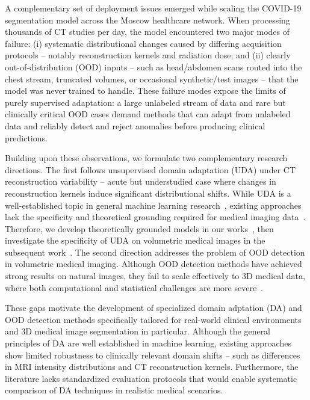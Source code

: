 A complementary set of deployment issues emerged while scaling the COVID-19 segmentation model across the Moscow healthcare network. When processing thousands of CT studies per day, the model encountered two major modes of failure: (i) systematic distributional changes caused by differing acquisition protocols -- notably reconstruction kernels and radiation dose; and (ii) clearly out-of-distribution (OOD) inputs -- such as head/abdomen scans routed into the chest stream, truncated volumes, or occasional synthetic/test images -- that the model was never trained to handle. These failure modes expose the limits of purely supervised adaptation: a large unlabeled stream of data and rare but clinically critical OOD cases demand methods that can adapt from unlabeled data and reliably detect and reject anomalies before producing clinical predictions.

Building upon these observations, we formulate two complementary research directions. The first follows unsupervised domain adaptation (UDA) under CT reconstruction variability -- acute but understudied case where changes in reconstruction kernels induce significant distributional shifts. While UDA is a well-established topic in general machine learning research~\cite{dann}, existing approaches lack the specificity and theoretical grounding required for medical imaging data~\cite{gulrajani2020search,uda_survey_2020,zhuang2020comprehensive,peng2018visda,zhang2021empirical}. Therefore, we develop theoretically grounded models in our works~\cite{saparov2021zero,shimovolos2022adaptation}, then investigate the specificity of UDA on volumetric medical images in the subsequent work~\cite{shirokikh2025m3da}. The second direction addresses the problem of OOD detection in volumetric medical imaging. Although OOD detection methods have achieved strong results on natural images, they fail to scale effectively to 3D medical data, where both computational and statistical challenges are more severe~\cite{vasiliuk2023limitations}.

These gaps motivate the development of specialized domain adptation (DA) and OOD detection methods specifically tailored for real-world clinical environments and 3D medical image segmentation in particular. Although the general principles of DA are well established in machine learning, existing approaches show limited robustness to clinically relevant domain shifts -- such as differences in MRI intensity distributions and CT reconstruction kernels. Furthermore, the literature lacks standardized evaluation protocols that would enable systematic comparison of DA techniques in realistic medical scenarios.

